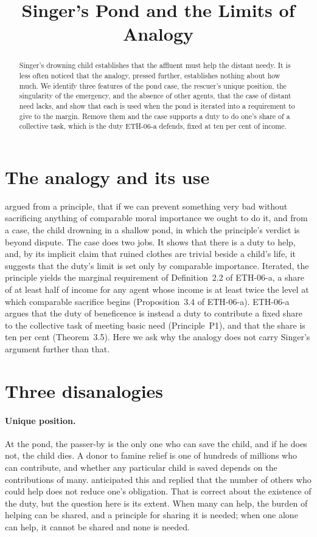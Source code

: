 \documentclass{situationist-preprint}
\title{Singer's Pond and the Limits of Analogy}
\begin{document}
\maketitle

\begin{abstract}
Singer's drowning child establishes that the affluent must help the distant needy. It is less often noticed that the analogy, pressed further, establishes nothing about how much. We identify three features of the pond case, the rescuer's unique position, the singularity of the emergency, and the absence of other agents, that the case of distant need lacks, and show that each is used when the pond is iterated into a requirement to give to the margin. Remove them and the case supports a duty to do one's share of a collective task, which is the duty ETH-06-a defends, fixed at ten per cent of income.
\end{abstract}

\section{The analogy and its use}

\citet{Singer1972} argued from a principle, that if we can prevent something very bad without sacrificing anything of comparable moral importance we ought to do it, and from a case, the child drowning in a shallow pond, in which the principle's verdict is beyond dispute. The case does two jobs. It shows that there is a duty to help, and, by its implicit claim that ruined clothes are trivial beside a child's life, it suggests that the duty's limit is set only by comparable importance. Iterated, the principle yields the marginal requirement of Definition~2.2 of ETH-06-a, a share of at least half of income for any agent whose income is at least twice the level at which comparable sacrifice begins (Proposition~3.4 of ETH-06-a). ETH-06-a argues that the duty of beneficence is instead a duty to contribute a fixed share to the collective task of meeting basic need (Principle~P1), and that the share is ten per cent (Theorem~3.5). Here we ask why the analogy does not carry Singer's argument further than that.

\section{Three disanalogies}

\paragraph{Unique position.} At the pond, the passer-by is the only one who can save the child, and if he does not, the child dies. A donor to famine relief is one of hundreds of millions who can contribute, and whether any particular child is saved depends on the contributions of many. \citet{Singer1972} anticipated this and replied that the number of others who could help does not reduce one's obligation. That is correct about the existence of the duty, but the question here is its extent. When many can help, the burden of helping can be shared, and a principle for sharing it is needed; when one alone can help, it cannot be shared and none is needed.
\end{document}
